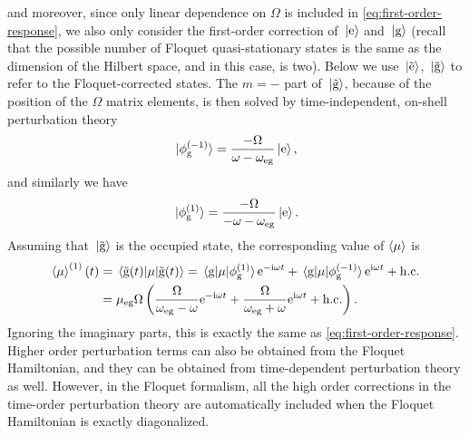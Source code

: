 \documentclass[hyperref, a4paper]{article}
\newcommand*{\ii}{\mathrm{i}}
\newcommand*{\ee}{\mathrm{e}}
\newcommand*{\omegaeg}{\omega_{\text{eg}}}
\newcommand*{\mueg}{\mu_{\text{eg}}}
\begin{document}
and moreover, since only linear dependence on $\Omega$ is included in \eqref{eq:first-order-response},
we also only consider the first-order correction of $\ket*{\text{e}}$ and $\ket*{\text{g}}$
(recall that the possible number of Floquet quasi-stationary states 
is the same as the dimension of the Hilbert space, 
and in this case, is two).
Below we use $\ket*{\tilde{\text{e}}}$, $\ket*{\tilde{\text{g}}}$
to refer to the Floquet-corrected states.
The $m=-$ part of $\ket*{\tilde{\text{g}}}$, 
because of the position of the $\Omega$ matrix elements, is then solved 
by time-independent, on-shell perturbation theory
\begin{equation}
    \ket*{\phi_\text{g}^{(-1)}} = \frac{- \Omega}{\omega - \omegaeg} \ket*{\text{e}},
\end{equation}
and similarly we have 
\begin{equation}
    \ket*{\phi_{\text{g}}^{(1)}} = \frac{-\Omega}{- \omega - \omegaeg} \ket*{\text{e}}.
\end{equation}
Assuming that $\ket*{\tilde{\text{g}}}$ is the occupied state,
the corresponding value of $\expval{\mu}$ is 
\begin{equation}
    \begin{aligned}
        \expval{\mu}^{(1)}(t) &= \expval*{\mu}{\tilde{\text{g}}(t)}
        = \mel*{\text{g}}{\mu}{\phi_\text{g}^{(1)}} \ee^{- \ii \omega t} 
        + \mel*{\text{g}}{\mu}{\phi_\text{g}^{(-1)}} \ee^{ \ii \omega t} 
        + \text{h.c.} \\
        &= \mueg \Omega \left(
            \frac{\Omega}{\omegaeg - \omega} \ee^{- \ii \omega t}
            + \frac{\Omega}{\omegaeg + \omega} \ee^{\ii \omega t} + \text{h.c.}
        \right).
    \end{aligned}
\end{equation}
Ignoring the imaginary parts, this is exactly the same as \eqref{eq:first-order-response}.
Higher order perturbation terms can also be obtained from the Floquet Hamiltonian, 
and they can be obtained from time-dependent perturbation theory as well.
However, in the Floquet formalism, 
all the high order corrections in the time-order perturbation theory 
are automatically included when the Floquet Hamiltonian is exactly diagonalized.
\end{document}
